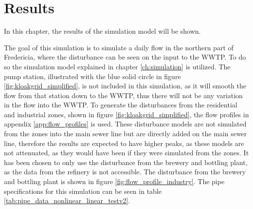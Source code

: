 \chapter{Results}\label{ch:results}
In this chapter, the results of the simulation model will be shown.


The goal of this simulation is to simulate a daily flow in the northern part of Fredericia, where the disturbance can be seen on the input to the WWTP. To do so the simulation model explained in chapter \ref{ch:simulation} is utilized. The pump station, illustrated with the blue solid circle in figure \ref{fig:kloakgrid_simplified}, is not included in this simulation, as it will smooth the flow from that station down to the WWTP, thus there will not be any variation in the flow into the WWTP. To generate the disturbances from the residential and industrial zones, shown in figure \ref{fig:kloakgrid_simplified}, the flow profiles in appendix \ref{app:flow_profiles} is used. These disturbance models are not simulated from the zones into the main sewer line but are directly added on the main sewer line, therefore the results are expected to have higher peaks, as these models are not attenuated, as they would have been if they were simulated from the zones. It has been chosen to only use the disturbance from the brewery and bottling plant, as the data from the refinery is not accessible. The disturbance from the brewery and bottling plant is shown in figure \ref{fig:flow_profile_industry}. The pipe specifications for this simulation can be seen in table \ref{tab:pipe_data_nonlinear_linear_testv2}.  
